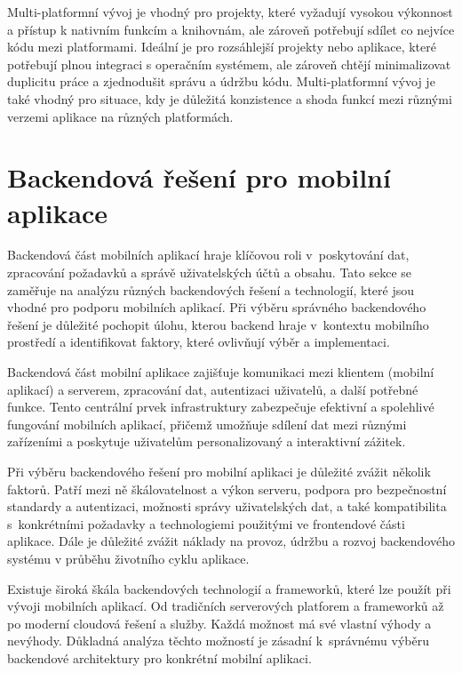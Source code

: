 Multi-platformní vývoj je vhodný pro projekty, které vyžadují vysokou výkonnost a přístup k nativním funkcím a knihovnám, ale zároveň potřebují sdílet co nejvíce kódu mezi platformami. Ideální je pro rozsáhlejší projekty nebo aplikace, které potřebují plnou integraci s operačním systémem, ale zároveň chtějí minimalizovat duplicitu práce a zjednodušit správu a údržbu kódu. Multi-platformní vývoj je také vhodný pro situace, kdy je důležitá konzistence a shoda funkcí mezi různými verzemi aplikace na různých platformách.

\section{Backendová řešení pro mobilní aplikace}\label{backend}

Backendová část mobilních aplikací hraje klíčovou roli v~poskytování dat, zpracování požadavků a správě uživatelských účtů a obsahu. Tato sekce se zaměřuje na analýzu různých backendových řešení a technologií, které jsou vhodné pro podporu mobilních aplikací. Při výběru správného backendového řešení je důležité pochopit úlohu, kterou backend hraje v~kontextu mobilního prostředí a identifikovat faktory, které ovlivňují výběr a implementaci.

Backendová část mobilní aplikace zajišťuje komunikaci mezi klientem (mobilní aplikací) a serverem, zpracování dat, autentizaci uživatelů, a další potřebné funkce. Tento centrální prvek infrastruktury zabezpečuje efektivní a spolehlivé fungování mobilních aplikací, přičemž umožňuje sdílení dat mezi různými zařízeními a poskytuje uživatelům personalizovaný a interaktivní zážitek.

Při výběru backendového řešení pro mobilní aplikaci je důležité zvážit několik faktorů. Patří mezi ně škálovatelnost a výkon serveru, podpora pro bezpečnostní standardy a autentizaci, možnosti správy uživatelských dat, a také kompatibilita s~konkrétními požadavky a technologiemi použitými ve frontendové části aplikace. Dále je důležité zvážit náklady na provoz, údržbu a rozvoj backendového systému v průběhu životního cyklu aplikace.

Existuje široká škála backendových technologií a frameworků, které lze použít při vývoji mobilních aplikací. Od tradičních serverových platforem a frameworků až po moderní cloudová řešení a služby. Každá možnost má své vlastní výhody a nevýhody. Důkladná analýza těchto možností je zásadní k~správnému výběru backendové architektury pro konkrétní mobilní aplikaci.

